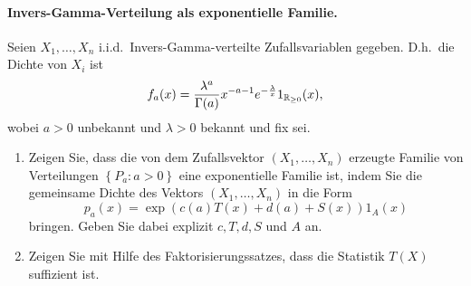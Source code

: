 \paragraph{Invers-Gamma-Verteilung als exponentielle Familie.}
Seien $X_1,\ldots,X_n$ i.i.d.\ Invers-Gamma-verteilte Zufallsvariablen gegeben.
D.h.\ die Dichte von $X_i$ ist 
\begin{equation*}
    f_{a}(x) = \frac{\lambda^a}{\Gamma(a)}x^{-a-1} e^{-\frac{\lambda}{x}}1_{\mathbb R_{\geq 0}}(x),
\end{equation*}
wobei $a>0$ unbekannt und $\lambda>0$ bekannt und fix sei.
\begin{enumerate}
    \item Zeigen Sie, dass die von dem Zufallsvektor $( X_1,\ldots,X_n)$
        erzeugte Familie von Verteilungen $\left\{ P_a : a>0 \right\}$ eine
        exponentielle Familie ist, indem Sie die gemeinsame Dichte des Vektors
        $(X_1,\ldots,X_n)$ in die Form
        \begin{equation*}
            p_a(x) = \exp\left( c(a) T(x) + d(a) + S(x) \right)1_A (x)
        \end{equation*}
        bringen. Geben Sie dabei explizit $c,T,d,S$ und $A$ an.
    \item Zeigen Sie mit Hilfe des Faktorisierungssatzes, dass die Statistik
        $T(X)$ suffizient ist.
\end{enumerate}

